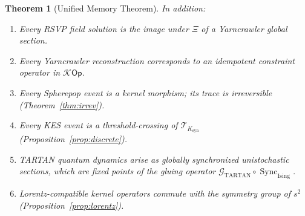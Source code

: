 \documentclass[12pt]{article}
\newtheorem{theorem}{Theorem}[section]
\newcommand{\Kcal}{\mathcal{K}}
\begin{document}
\begin{theorem}[Unified Memory Theorem]
In addition:
\begin{enumerate}[label=(\alph*)]
  \item Every RSVP field solution is the image under $\Xi$ of a Yarncrawler
    global section.
  \item Every Yarncrawler reconstruction corresponds to an idempotent
    constraint operator in $\Kcal\mathsf{Op}$.
  \item Every Spherepop event is a kernel morphism; its trace is
    irreversible (Theorem~\ref{thm:irrev}).
  \item Every KES event is a threshold-crossing of
    $\mathcal{T}_{K_{\mathrm{syn}}}$ (Proposition~\ref{prop:discrete}).
  \item TARTAN quantum dynamics arise as globally synchronized unistochastic
    sections, which are fixed points of the gluing operator
    $\mathcal{G}_{\mathrm{TARTAN}}\circ\operatorname{Sync}_{\mathrm{Ising}}$.
  \item Lorentz-compatible kernel operators commute with the symmetry group
    of $s^2$ (Proposition~\ref{prop:lorentz}).
\end{enumerate}
\end{theorem}
\end{document}

